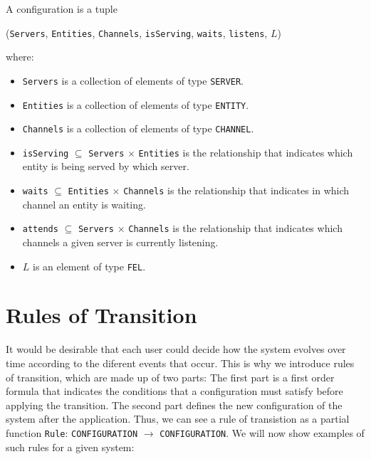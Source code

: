 \documentclass{article}
\begin{document}
A configuration is a tuple 
\begin{center}
	(\verb|Servers|, \verb|Entities|, \verb|Channels|, \verb|isServing|, \verb|waits|, \verb|listens|, $L$)
\end{center}
where:
\begin{itemize}
	\item \verb|Servers| is a collection of elements of type \verb|SERVER|. 
	\item \verb|Entities| is a collection of elements of type \verb|ENTITY|. 
	\item \verb|Channels| is a collection of elements of type \verb|CHANNEL|. 
	\item \verb|isServing| $\subseteq$ \verb|Servers| $\times$ \verb|Entities| is the relationship that indicates which entity is being served by which server. 
	\item \verb|waits| $\subseteq$ \verb|Entities| $\times$ \verb|Channels| is the relationship that indicates in which channel an entity is waiting. 
	\item \verb|attends| $\subseteq$ \verb|Servers| $\times$ \verb|Channels| is the relationship that indicates which channels a given server is currently listening.  
	\item $L$ is an element of type \verb|FEL|. 
\end{itemize}

\section*{Rules of Transition}
It would be desirable that each user could decide how the system evolves over time according to the diferent events that occur. This is why we introduce rules of transition, which are made up of two parts: The first part is a first order formula that indicates the conditions that a configuration must satisfy before applying the transition. The second part defines the new configuration of the system after the application. Thus, we can see a rule of transistion as a partial function \verb|Rule|: \verb|CONFIGURATION| $\to$ \verb|CONFIGURATION|. We will now show examples of such rules for a given system: 

\begin{center}
  \begin{prooftree}




  \end{prooftree}
\end{center}



 







 

	
\end{document}
